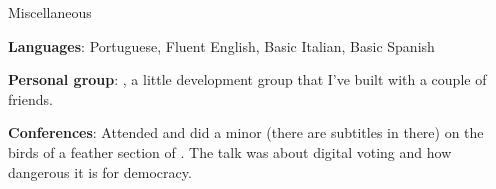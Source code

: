 \begin{rubric}{Miscellaneous}{

    \entry* \textbf{Languages}: Portuguese, Fluent English, Basic Italian, Basic
    Spanish

    \entry* \textbf{Personal group}: , a
    little development group that I've built with a couple of friends.

    \entry* \textbf{Conferences}: Attended and did a minor
    (there are subtitles in there) on the birds of a feather section of
    . The
    talk was about digital voting and how dangerous it is for democracy.
        
}\end{rubric}
